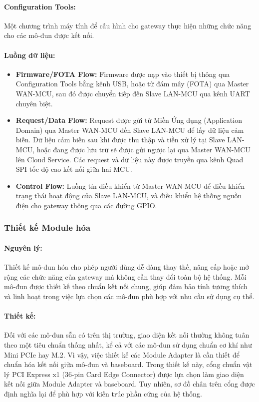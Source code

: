             \paragraph{Configuration Tools:}\par
                Một chương trình máy tính để cấu hình cho gateway thực hiện những chức năng cho các mô-đun được kết nối.
            \paragraph{Luồng dữ liệu:}\par
                \begin{itemize}
                    \item \textbf{Firmware/FOTA Flow:} Firmware được nạp vào thiết bị thông qua Configuration Tools bằng kênh USB, hoặc từ đám mây (FOTA) qua Master WAN-MCU, sau đó được chuyển tiếp đến Slave LAN-MCU qua kênh UART chuyên biệt.
                    \item \textbf{Request/Data Flow:} Request được gửi từ Miền Ứng dụng (Application Domain) qua Master WAN-MCU đến Slave LAN-MCU để lấy dữ liệu cảm biến. Dữ liệu cảm biến sau khi được thu thập và tiền xử lý tại Slave LAN-MCU, hoặc đang được lưu trữ sẽ được gửi ngược lại qua Master WAN-MCU lên Cloud Service. Các request và dữ liệu này được truyền qua kênh Quad SPI tốc độ cao kết nối giữa hai MCU.
                    \item \textbf{Control Flow:} Luồng tín điều khiển từ Master WAN-MCU để điều khiển trạng thái hoạt động của Slave LAN-MCU, và điều khiển hệ thống nguồn điện cho gateway thông qua các đường GPIO.
                \end{itemize}

        \subsubsection{Thiết kế Module hóa}
            \paragraph{Nguyên lý:}\par
                Thiết kế mô-đun hóa cho phép người dùng dễ dàng thay thế, nâng cấp hoặc mở rộng các chức năng của gateway mà không cần thay đổi toàn bộ hệ thống. Mỗi mô-đun được thiết kế theo chuẩn kết nối chung, giúp đảm bảo tính tương thích và linh hoạt trong việc lựa chọn các mô-đun phù hợp với nhu cầu sử dụng cụ thể.
            \paragraph{Thiết kế:}\par
                Đối với các mô-đun sẵn có trên thị trường, giao diện kết nối thường không tuân theo một tiêu chuẩn thống nhất, kể cả với các mô-đun sử dụng chuẩn cơ khí như Mini PCIe hay M.2. Vì vậy, việc thiết kế các Module Adapter là cần thiết để chuẩn hóa kết nối giữa mô-đun và baseboard. Trong thiết kế này, cổng chuẩn vật lý PCI Express x1 (36-pin Card Edge Connector) được lựa chọn làm giao diện kết nối giữa Module Adapter và baseboard. Tuy nhiên, sơ đồ chân trên cổng được định nghĩa lại để phù hợp với kiến trúc phần cứng của hệ thống.

